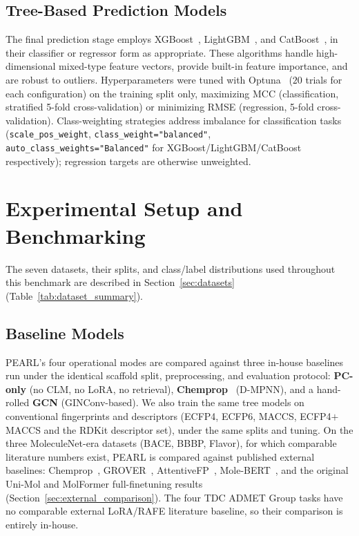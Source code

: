 \documentclass[pdflatex,sn-mathphys-num]{sn-jnl}%
\begin{document}
\subsection{Tree-Based Prediction Models}\label{sec:tree_models}
The final prediction stage employs XGBoost~\cite{chen2016xgboost}, LightGBM~\cite{ke2017lightgbm}, and CatBoost~\cite{prokhorenkova2018catboost}, in their classifier or regressor form as appropriate. These algorithms handle high-dimensional mixed-type feature vectors, provide built-in feature importance, and are robust to outliers. Hyperparameters were tuned with Optuna~\cite{akiba2019optuna} ($20$ trials for each configuration) on the training split only, maximizing MCC (classification, stratified 5-fold cross-validation) or minimizing RMSE (regression, 5-fold cross-validation). Class-weighting strategies address imbalance for classification tasks (\texttt{scale\_pos\_weight}, \texttt{class\_weight="balanced"}, \texttt{auto\_class\_weights="Balanced"} for XGBoost/LightGBM/CatBoost respectively); regression targets are otherwise unweighted.

\section{Experimental Setup and Benchmarking}\label{sec:experimental_setup}
The seven datasets, their splits, and class/label distributions used throughout this benchmark are described in Section~\ref{sec:datasets} (Table~\ref{tab:dataset_summary}).

\subsection{Baseline Models}\label{sec:baselines}
PEARL's four operational modes are compared against three in-house baselines run under the identical scaffold split, preprocessing, and evaluation protocol: \textbf{PC-only} (no CLM, no LoRA, no retrieval), \textbf{Chemprop}~\cite{yang2019chemprop} (D-MPNN), and a hand-rolled \textbf{GCN} (GINConv-based). We also train the same tree models on conventional fingerprints and descriptors (ECFP4, ECFP6, MACCS, ECFP4$+$MACCS and the RDKit descriptor set), under the same splits and tuning. On the three MoleculeNet-era datasets (BACE, BBBP, Flavor), for which comparable literature numbers exist, PEARL is compared against published external baselines: Chemprop~\cite{yang2019chemprop}, GROVER~\cite{rong2020grover}, AttentiveFP~\cite{xiong2020attentivefp}, Mole-BERT~\cite{xia2023molecbert}, and the original Uni-Mol and MolFormer full-finetuning results (Section~\ref{sec:external_comparison}). The four TDC ADMET Group tasks have no comparable external LoRA/RAFE literature baseline, so their comparison is entirely in-house.
\end{document}
